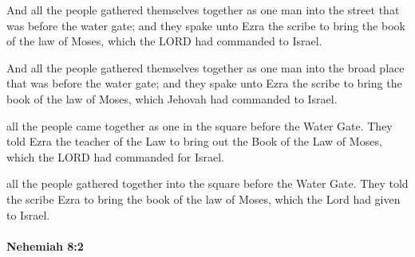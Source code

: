 			And all the people gathered themselves together as one man into the street that was before the water gate; and they spake unto Ezra the scribe to bring the book of the law of Moses, which the LORD had commanded to Israel.

			\begin{versebox}
					\item[BHS] 
					\item[LXX] 
					\item[ASV] And all the people gathered themselves together as one man into the broad place that was before the water gate; and they spake unto Ezra the scribe to bring the book of the law of Moses, which Jehovah had commanded to Israel.
					\item[NIV] all the people came together as one in the square before the Water Gate. They told Ezra the teacher of the Law to bring out the Book of the Law of Moses, which the LORD had commanded for Israel.
					\item[NRSV] all the people gathered together into the square before the Water Gate. They told the scribe Ezra to bring the book of the law of Moses, which the Lord had given to Israel.
			\end{versebox}

		\paragraph{Nehemiah 8:2} %
			\label{NEHEMIAH-8-2}


